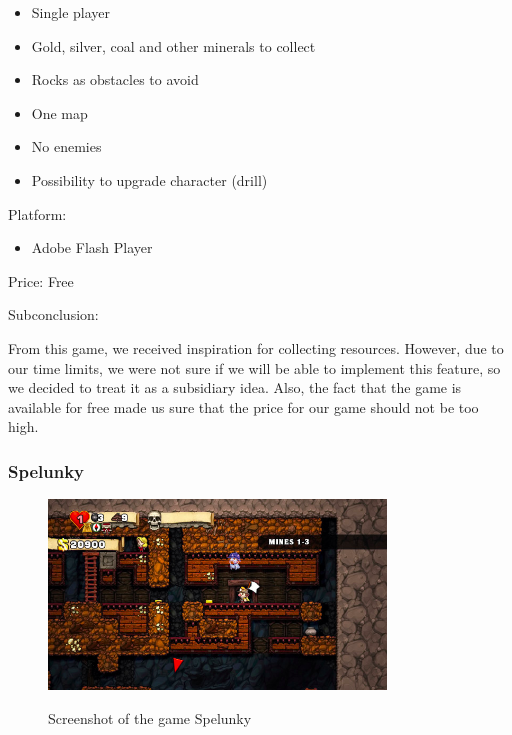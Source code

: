 \documentclass[12p]{article}
\begin{document}
\begin{itemize}
  \item Single player
  \item Gold, silver, coal and other minerals to collect
  \item Rocks as obstacles to avoid
  \item One map
  \item No enemies
  \item Possibility to upgrade character (drill)
\end{itemize}

Platform: 

\begin{itemize}
    \item Adobe Flash Player
\end{itemize}

Price: Free

Subconclusion:

From this game, we received inspiration for collecting resources. However, due to our time limits, we were not sure if we will be able to implement this feature, so we decided to treat it as a subsidiary idea. Also, the fact that the game is available for free made us sure that the price for our game should not be too high.



\newpage
\subsubsection[Spelunky]{Spelunky \cite{Spelunky}}

\begin{figure}[ht]
  \center
  \includegraphics[width=0.8\textwidth]{StateOfTheArtScreenshots/spelunky}
  \label{sec:StateOfTheArt_Screenshots_Spelunky}
  \caption{Screenshot of the game Spelunky \cite{SpelunkyScreenshot}}
\end{figure}
\end{document}
